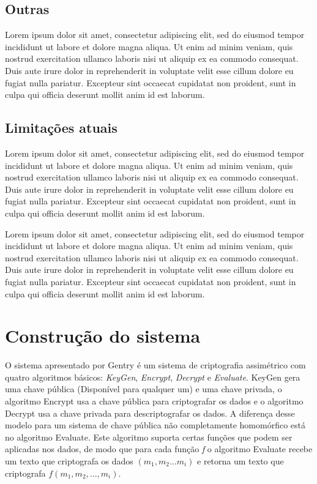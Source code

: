 	\subsection{Outras}
	Lorem ipsum dolor sit amet, consectetur adipiscing elit, sed do eiusmod tempor incididunt ut labore et dolore magna aliqua. Ut enim ad minim veniam, quis nostrud exercitation ullamco laboris nisi ut aliquip ex ea commodo consequat. Duis aute irure dolor in reprehenderit in voluptate velit esse cillum dolore eu fugiat nulla pariatur. Excepteur sint occaecat cupidatat non proident, sunt in culpa qui officia deserunt mollit anim id est laborum.
	
	\subsection{Limitações atuais}
	Lorem ipsum dolor sit amet, consectetur adipiscing elit, sed do eiusmod tempor incididunt ut labore et dolore magna aliqua. Ut enim ad minim veniam, quis nostrud exercitation ullamco laboris nisi ut aliquip ex ea commodo consequat. Duis aute irure dolor in reprehenderit in voluptate velit esse cillum dolore eu fugiat nulla pariatur. Excepteur sint occaecat cupidatat non proident, sunt in culpa qui officia deserunt mollit anim id est laborum.
	
	Lorem ipsum dolor sit amet, consectetur adipiscing elit, sed do eiusmod tempor incididunt ut labore et dolore magna aliqua. Ut enim ad minim veniam, quis nostrud exercitation ullamco laboris nisi ut aliquip ex ea commodo consequat. Duis aute irure dolor in reprehenderit in voluptate velit esse cillum dolore eu fugiat nulla pariatur. Excepteur sint occaecat cupidatat non proident, sunt in culpa qui officia deserunt mollit anim id est laborum.
	
\newpage

\section{Construção do sistema}\label{sec:LABEL_CHP_1_SEC_C}
O sistema apresentado por Gentry é um sistema de criptografia assimétrico com quatro algoritmos básicos: \textit{KeyGen}, \textit{Encrypt}, \textit{Decrypt} e \textit{Evaluate}. KeyGen gera uma chave pública (Disponível para qualquer um) e uma chave privada, o algoritmo Encrypt usa a chave pública para criptografar os dados e o algoritmo Decrypt usa a chave privada para descriptografar os dados. A diferença desse modelo para um sistema de chave pública não completamente homomórfico está no algoritmo Evaluate. Este algoritmo suporta certas funções que podem ser aplicadas nos dados, de modo que para cada função \textit{f} o algoritmo Evaluate recebe um texto que criptografa os dados \((m_1,m_2...m_i)\) e retorna um texto que criptografa \( f(m_1,m_2,...,m_i) \).

